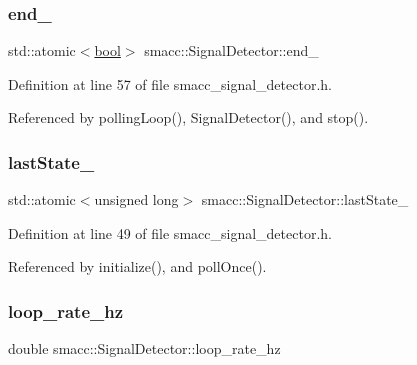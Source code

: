 \subsubsection{\texorpdfstring{end\+\_\+}{end\_}}
{\footnotesize\ttfamily std\+::atomic$<$\hyperlink{classbool}{bool}$>$ smacc\+::\+Signal\+Detector\+::end\+\_\+\hspace{0.3cm}{\ttfamily [private]}}



Definition at line 57 of file smacc\+\_\+signal\+\_\+detector.\+h.



Referenced by polling\+Loop(), Signal\+Detector(), and stop().

\mbox{\label{classsmacc_1_1SignalDetector_a72293ed0e98f4200fbe75b53f1e41eab}} 
\subsubsection{\texorpdfstring{last\+State\+\_\+}{lastState\_}}
{\footnotesize\ttfamily std\+::atomic$<$unsigned long$>$ smacc\+::\+Signal\+Detector\+::last\+State\+\_\+\hspace{0.3cm}{\ttfamily [private]}}



Definition at line 49 of file smacc\+\_\+signal\+\_\+detector.\+h.



Referenced by initialize(), and poll\+Once().

\mbox{\label{classsmacc_1_1SignalDetector_a41a2ae4262ed350f46d8b886bdc1dfa5}} 
\subsubsection{\texorpdfstring{loop\+\_\+rate\+\_\+hz}{loop\_rate\_hz}}
{\footnotesize\ttfamily double smacc\+::\+Signal\+Detector\+::loop\+\_\+rate\+\_\+hz\hspace{0.3cm}{\ttfamily [private]}}



